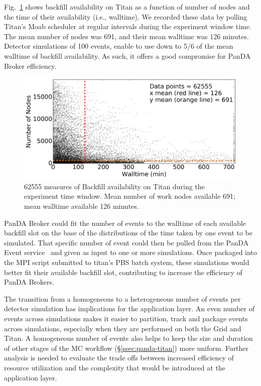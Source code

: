Fig.~\ref{fig:backfill-distrib} shows backfill availability on Titan as a
function of number of nodes and the time of their availability (i.e.,
walltime). We recorded these data by polling Titan's Moab scheduler at
regular intervals during the experiment window time. The mean number of nodes
was 691, and their mean walltime was 126 minutes. Detector simulations of 100
events, enable to use down to 5/6 of the mean walltime of backfill
availability. As such, it offers a good compromise for PanDA Broker
efficiency.

\begin{figure}[!t]
    \includegraphics[clip,width=\columnwidth]{titan_backfill_avail.png}
    \vspace{-0.3in}
    \caption{62555 measures of Backfill availability on Titan during the
    experiment time window. Mean number of work nodes available 691; mean
    walltime available 126 minutes.}\label{fig:backfill-distrib}
\end{figure}

PanDA Broker could fit the number of events to the walltime of each available
backfill slot on the base of the distributions of the time taken by one event
to be simulated. That specific number of event could then be pulled from the
PanDA Event service~\cite{calafiura2015atlas} and given as input to one or
more simulations. Once packaged into the MPI script submitted to titan's PBS
batch system, these simulations would better fit their available backfill
slot, contributing to increase the efficiency of PanDA Brokers.

The transition from a homogeneous to a heterogeneous number of events per
detector simulation has implications for the application layer. An even
number of events across simulations makes it easier to partition, track and
package events across simulations, especially when they are performed on both
the Grid and Titan. A homogeneous number of events also helps to keep the
size and duration of other stages of the MC workflow
(\S\ref{ssec:panda-titan}) more uniform. Further analysis is needed to
evaluate the trade offs between increased efficiency of resource utilization
and the complexity that would be introduced at the application layer.

